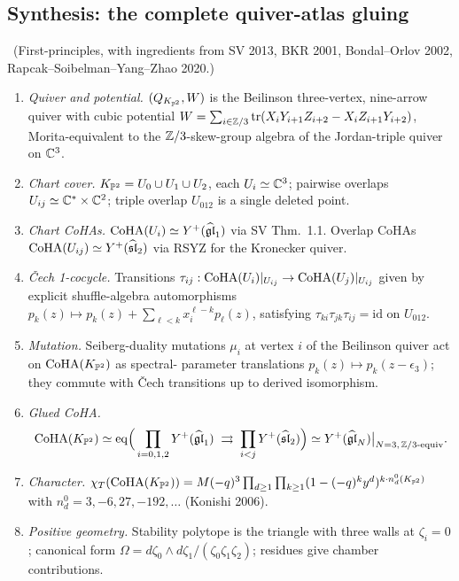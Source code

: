 \subsection*{Synthesis: the complete quiver-atlas gluing}

\begin{theorem}
\label{thm:local-P2-coha-gluing}
\ClaimStatusDerivation\ (First-principles, with ingredients from SV 2013,
BKR 2001, Bondal--Orlov 2002, Rapcak--Soibelman--Yang--Zhao 2020.)
\begin{enumerate}
\item[(i)] \emph{Quiver and potential.} $(Q_{K_{\mathbb{P}^2}},W)$ is the
Beilinson three-vertex, nine-arrow quiver with cubic potential
$W=\sum_{i\in\mathbb{Z}/3}\mathrm{tr}(X_iY_{i+1}Z_{i+2}-X_iZ_{i+1}Y_{i+2})$,
Morita-equivalent to the $\mathbb{Z}/3$-skew-group algebra of the
Jordan-triple quiver on $\mathbb{C}^3$.
\item[(ii)] \emph{Chart cover.} $K_{\mathbb{P}^2}=U_0\cup U_1\cup U_2$, each
$U_i\simeq\mathbb{C}^3$; pairwise overlaps $U_{ij}\simeq\mathbb{C}^*\times\mathbb{C}^2$;
triple overlap $U_{012}$ is a single deleted point.
\item[(iii)] \emph{Chart CoHAs.}
$\mathrm{CoHA}(U_i)\simeq Y^+(\widehat{\mathfrak{gl}}_1)$ via SV Thm.\ 1.1.
Overlap CoHAs $\mathrm{CoHA}(U_{ij})\simeq Y^+(\widehat{\mathfrak{sl}}_2)$ via
RSYZ for the Kronecker quiver.
\item[(iv)] \emph{\v Cech 1-cocycle.} Transitions
$\tau_{ij}:\mathrm{CoHA}(U_i)|_{U_{ij}}\to\mathrm{CoHA}(U_j)|_{U_{ij}}$ given by
explicit shuffle-algebra automorphisms
$p_k(z)\mapsto p_k(z)+\sum_{\ell<k}x_i^{\ell-k}p_\ell(z)$,
satisfying $\tau_{ki}\tau_{jk}\tau_{ij}=\mathrm{id}$ on $U_{012}$.
\item[(v)] \emph{Mutation.} Seiberg-duality mutations $\mu_i$ at vertex
$i$ of the Beilinson quiver act on $\mathrm{CoHA}(K_{\mathbb{P}^2})$ as spectral-
parameter translations $p_k(z)\mapsto p_k(z-\epsilon_3)$; they commute
with \v Cech transitions up to derived isomorphism.
\item[(vi)] \emph{Glued CoHA.}
\[
\mathrm{CoHA}(K_{\mathbb{P}^2})\simeq
\mathrm{eq}\Big(\prod_{i=0,1,2}Y^+(\widehat{\mathfrak{gl}}_1)
\;\rightrightarrows\;\prod_{i<j}Y^+(\widehat{\mathfrak{sl}}_2)\Big)
\simeq Y^+(\widehat{\mathfrak{gl}}_N)\big|_{N=3,\,\mathbb{Z}/3\text{-equiv}}.
\]
\item[(vii)] \emph{Character.}
$\chi_T(\mathrm{CoHA}(K_{\mathbb{P}^2}))=M(-q)^3\prod_{d\geq 1}\prod_{k\geq 1}
(1-(-q)^ky^d)^{k\cdot n_d^0(K_{\mathbb{P}^2})}$
with $n_d^0=3,-6,27,-192,\ldots$ (Konishi 2006).
\item[(viii)] \emph{Positive geometry.} Stability polytope is the
triangle with three walls at $\zeta_i=0$; canonical form
$\Omega=d\zeta_0\wedge d\zeta_1/(\zeta_0\zeta_1\zeta_2)$; residues give
chamber contributions.
\end{enumerate}
\end{theorem}

